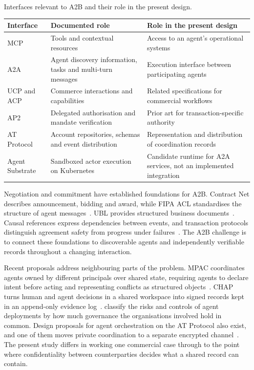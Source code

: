 \noindent\begin{minipage}{\textwidth}
\captionsetup{type=table}
\centering\small
\caption{Interfaces relevant to A2B and their role in the present design.}
\label{tab:landscape}
\begin{tabularx}{\textwidth}{@{}P{2.2cm}LL@{}}
\toprule
Interface & Documented role & Role in the present design \\
\midrule
MCP & Tools and contextual resources & Access to an agent's operational systems \\
A2A & Agent discovery information, tasks and multi-turn messages & Execution interface between participating agents \\
UCP and ACP & Commerce interactions and capabilities & Related specifications for commercial workflows \\
AP2 & Delegated authorisation and mandate verification & Prior art for transaction-specific authority \\
AT Protocol & Account repositories, schemas and event distribution & Representation and distribution of coordination records \\
Agent Substrate & Sandboxed actor execution on Kubernetes & Candidate runtime for A2A services, not an implemented integration \\
\bottomrule
\end{tabularx}
\end{minipage}

Negotiation and commitment have established foundations for A2B. Contract Net describes announcement, bidding and award, while FIPA ACL standardises the structure of agent messages~\citep{smith1980contractnet,fipa2002acl}. UBL provides structured business documents~\citep{oasis2013ubl}. Causal references express dependencies between events, and transaction protocols distinguish agreement safety from progress under failures~\citep{lamport1978,graylamport2006}. The A2B challenge is to connect these foundations to discoverable agents and independently verifiable records throughout a changing interaction.

Recent proposals address neighbouring parts of the problem. MPAC coordinates agents owned by different principals over shared state, requiring agents to declare intent before acting and representing conflicts as structured objects~\citep{mpac2026}. CHAP turns human and agent decisions in a shared workspace into signed records kept in an append-only evidence log~\citep{chap2026}. \citet{multiagentrisks2026} classify the risks and controls of agent deployments by how much governance the organisations involved hold in common. Design proposals for agent orchestration on the AT Protocol also exist, and one of them moves private coordination to a separate encrypted channel~\citep{mycelium2026}. The present study differs in working one commercial case through to the point where confidentiality between counterparties decides what a shared record can contain.

